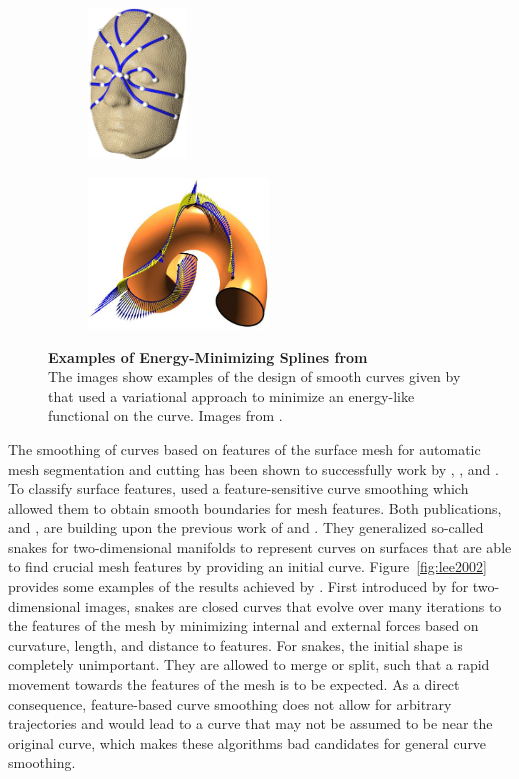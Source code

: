 \documentclass{stdlocal}
\begin{document}
\begin{figure}[t]
  \centering
  \begin{subfigure}[b]{0.39\linewidth}
    \centering
    \includegraphics[height=4cm]{images/hofer2004-1.png}
  \end{subfigure}
  \begin{subfigure}[b]{0.59\linewidth}
    \centering
    \includegraphics[height=4cm]{images/hofer2004-2.png}
  \end{subfigure}
  \caption[Examples of Energy-Minimizing Splines from \textcite{hofer2004}]{%
    \textbf{Examples of Energy-Minimizing Splines from \textcite{hofer2004}}\\
    The images show examples of the design of smooth curves given by \textcite{hofer2004} that used a variational approach to minimize an energy-like functional on the curve.
    Images from \textcite{hofer2004}.
  }
  \label{fig:hofer2004}
\end{figure}

The smoothing of curves based on features of the surface mesh for automatic mesh segmentation and cutting has been shown to successfully work by \textcite{jung2004}, \textcite{bischoff2005}, and \textcite{lai2007}.
To classify surface features, \textcite{lai2007} used a feature-sensitive curve smoothing which allowed them to obtain smooth boundaries for mesh features.
Both publications, \textcite{jung2004} and \textcite{bischoff2005}, are building upon the previous work of \textcite{lee2002} and \textcite{lee2004}.
They generalized so-called snakes for two-dimensional manifolds to represent curves on surfaces that are able to find crucial mesh features by providing an initial curve.
Figure~\ref{fig:lee2002} provides some examples of the results achieved by \textcite{lee2002}.
First introduced by \textcite{kass1988} for two-dimensional images, snakes are closed curves that evolve over many iterations to the features of the mesh by minimizing internal and external forces based on curvature, length, and distance to features.
For snakes, the initial shape is completely unimportant.
They are allowed to merge or split, such that a rapid movement towards the features of the mesh is to be expected.
As a direct consequence, feature-based curve smoothing does not allow for arbitrary trajectories and would lead to a curve that may not be assumed to be near the original curve, which makes these algorithms bad candidates for general curve smoothing.
\end{document}
